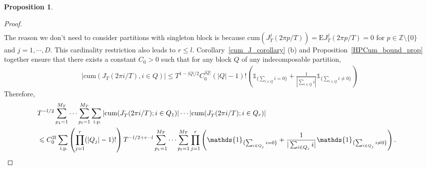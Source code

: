 \documentclass[11pt]{article}
\numberwithin{equation}{section}
\theoremstyle{plain}
\theoremstyle{definition}
\theoremstyle{definition}
\theoremstyle{assumption}
\theoremstyle{proposition}
\newtheorem{proposition}{Proposition}[section]
\theoremstyle{proposition}
\theoremstyle{example}
\theoremstyle{lemma}
\theoremstyle{theorem}
\theoremstyle{remark}
\begin{document}
\begin{proposition}
\begin{proof}
\begin{align*}
\end{align*}
The reason we don't  need to consider partitions with singleton block is because $\mathrm{cum}(J_T^{j}(2\pi p/T)) = \mathrm{E}J_T^{j}(2\pi p/T)=0$ for $p\in\mathbb{Z}\setminus\{0\}$ and $j=1,\cdots,D$. This cardinality restriction also leads to $r\leqslant l$.
Corollary~\ref{cum_J_corollary} (b) and Proposition~\ref{HPCum_bound_prop} together ensure that there exists a constant $C_{0}>0$ such that for any block $Q$ of any indecomposable partition,
\begin{align*}
&|\mathrm{cum}(J_T^{\cdot}(2\pi i/T), i\in Q)|
\leqslant T^{1-|Q|/2}C_0^{|Q|}(|Q|-1)!\left(\mathds{1}_{\{\sum_{i\in Q}i = 0\}} + \frac{1}{|\sum_{i\in Q}i|}\mathds{1}_{\{\sum_{i\in Q}i \neq 0\}}\right)
\end{align*}
Therefore, 
\begin{align}
&T^{-l/2}\sum_{p_1=1}^{M_T}\cdots\sum_{p_l=1}^{M_T}\sum_{\textrm{ i.p.}} |\mathrm{cum}(J_T^{\cdot}(2\pi i/T); i\in Q_1)|\cdots|\mathrm{cum}(J_T^{\cdot}(2\pi i/T); i\in Q_r)| \notag\\
&\leqslant C_0^{2l}\sum_{\textrm{ i.p.}}\left(\prod_{j=1}^{r}(|Q_j| - 1)!\right)T^{-l/2+r-l}\sum_{p_1=1}^{M_T}\cdots\sum_{p_l=1}^{M_T} \prod_{j=1}^{r}  \left( \mathds{1}_{\{\sum_{i\in Q_j}i = 0\}} + \frac{1}{|\sum_{i\in Q_j}i|}\mathds{1}_{\{\sum_{i\in Q_j}i \neq 0\}}\right) . \label{ineq_he1}
\end{align}


\end{proof}
\end{proposition}
\end{document}
